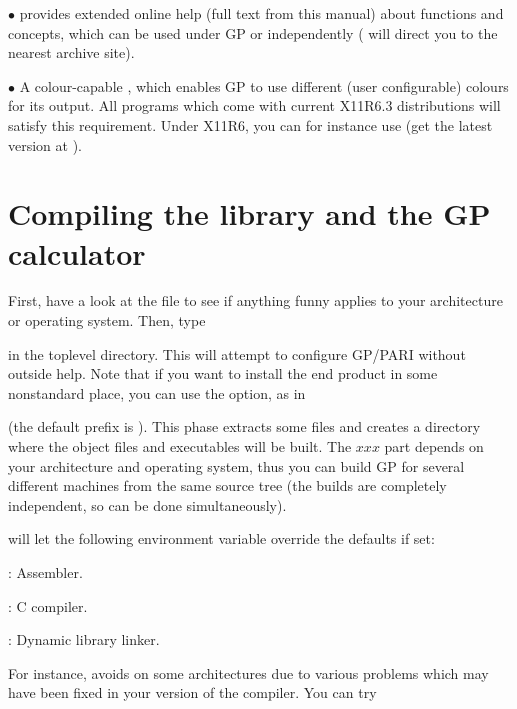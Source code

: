   $\bullet$  provides extended online help (full text from this
manual) about functions and concepts, which can be used under GP or
independently ( will direct you to the nearest
 archive site).

  $\bullet$ A colour-capable , which enables GP to use different
(user configurable) colours for its output. All  programs which come
with current X11R6.3 distributions will satisfy this requirement. Under X11R6,
you can for instance use  (get the latest version at
).

\vfill\eject
\section{Compiling the library and the GP calculator}

 First, have a look at the  file
to see if anything funny applies to your architecture or operating system.
Then, type 


\noindent in the toplevel directory. This will attempt to configure GP/PARI
without outside help. Note that if you want to install the end product in
some nonstandard place, you can use the  option, as in


\noindent (the default prefix is ). This phase extracts some
files and creates a directory  where the object files and
executables will be built. The $xxx$ part depends on your architecture and
operating system, thus you can build GP for several different machines from
the same source tree (the builds are completely independent, so can be done
simultaneously).

\noindent {} will let the following environment variable
override the defaults if set:

: Assembler.

: C compiler.

: Dynamic library linker.

\noindent For instance,  avoids  on some
architectures due to various problems which may have been fixed in your
version of the compiler. You can try


